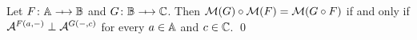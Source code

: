 \begin{theorem}
    Let \( F \colon \Grp \profarrow \Grpb \) and \( G \colon \Grpb \profarrow \Grpc \).
    Then \( \mathcal{M}({G}) \circ \mathcal{M}({F}) = \mathcal{M}({G \circ F}) \) if and only if \( \mathcal{A}^{F(a, {-})} \mathrel{\bot} \mathcal{A}^{G({-}, c)} \) for every \( a \in \mathbb{A} \) and \( c \in \mathbb{C} \).
    \qed
\end{theorem}





